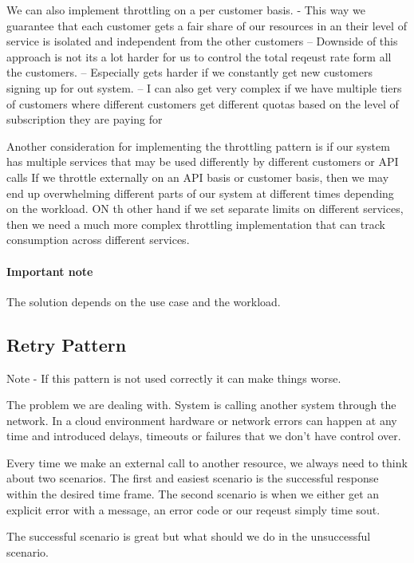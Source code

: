We can also implement throttling on a per customer basis.
- This way we guarantee that each customer gets a fair share of our resources in an their level of service is isolated and independent from the other customers
-- Downside of this approach is not its a lot harder for us to control the total reqeust rate form all the customers.
-- Especially gets harder if we constantly get new customers signing up for out system.
-- I can also get very complex if we have multiple tiers of customers where different customers get different quotas based on the level of subscription they are paying for

Another consideration for implementing the throttling pattern is if our system has multiple services that may be used differently by different customers or API calls
If we throttle externally on an API basis or customer basis, then we may end up overwhelming different parts of our system at different times depending on the workload.
ON th other hand if we set separate limits on different services, then we need a much more complex throttling implementation that can track consumption across different services.

\paragraph{Important note}
The solution depends on the use case and the workload.

\subsection{Retry Pattern}
Note - If this pattern is not used correctly it can make things worse.

The problem we are dealing with.
System is calling another system through the network.
In a cloud environment hardware or network errors can happen at any time and introduced delays, timeouts or failures that we don't have control over.

Every time we make an external call to another resource, we always need to think about two scenarios.
The first and easiest scenario is the successful response within the desired time frame.
The second scenario is when we either get an explicit error with a message, an error code or our reqeust simply time sout.

The successful scenario is great but what should we do in the unsuccessful scenario.


